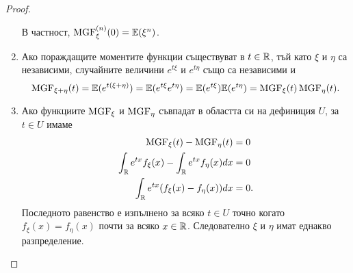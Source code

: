 \documentclass[numbers=endperiod, DIV=15, bibliography=totocnumbered]{scrartcl}
\begin{document}
\begin{proof}
\begin{enumerate}
    В частност, $\operatorname{MGF}^{(n)}_\xi(0) = \mathbb{E}(\xi^n)$.

    \item Ако пораждащите моментите функции съществуват в $t \in \mathbb{R}$, тъй като $\xi$ и $\eta$ са независими, случайните величини $e^{t\xi}$ и $e^{t\eta}$ също са независими и
    \begin{displaymath}
      \operatorname{MGF}_{\xi + \eta}(t)
      =
      \mathbb{E}(e^{t(\xi + \eta)})
      =
      \mathbb{E}(e^{t\xi} e^{t\eta})
      =
      \mathbb{E}(e^{t\xi}) \mathbb{E}(e^{t\eta})
      =
      \operatorname{MGF}_\xi(t) \operatorname{MGF}_\eta(t).
    \end{displaymath}

    \item Ако функциите $\operatorname{MGF}_\xi$ и $\operatorname{MGF}_\eta$ съвпадат в областта си на дефиниция $U$, за $t \in U$ имаме
    \begin{align*}
      \operatorname{MGF}_\xi(t) - \operatorname{MGF}_\eta(t) &= 0
      \\
      \int_{\mathbb{R}} e^{tx} f_\xi(x) - \int_{\mathbb{R}} e^{tx} f_\eta(x) dx &= 0
      \\
      \int_{\mathbb{R}} e^{tx} (f_\xi(x) - f_\eta(x)) dx &= 0.
    \end{align*}
    Последното равенство е изпълнено за всяко $t \in U$ точно когато $f_\xi(x) = f_\eta(x)$ почти за всяко $x \in \mathbb{R}$. Следователно $\xi$ и $\eta$ имат еднакво разпределение.
  \end{enumerate}
\end{proof}
\end{document}
